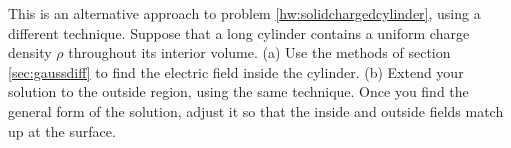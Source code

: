         This is an alternative approach to problem \ref{hw:solidchargedcylinder},
        using a different technique.
        Suppose that a long cylinder contains a uniform charge
        density $\rho$ throughout its interior volume. \hwendpart
        (a) Use the methods of section \ref{sec:gaussdiff}
        to find the electric field inside the cylinder. \answercheck\hwendpart
        (b) Extend your solution to the outside region, using the same
        technique. Once you find the general form of the solution,
        adjust it so that the inside and outside fields match up at
        the surface.\answercheck
